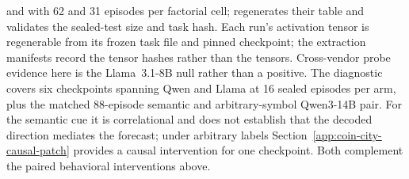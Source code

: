  and
 with 62 and 31 episodes per factorial
cell;  regenerates their table
and validates the sealed-test size and task hash. Each run's
activation tensor is regenerable from its frozen task file and pinned checkpoint;
the extraction manifests record the tensor hashes rather than the tensors.
Cross-vendor probe evidence here is the Llama~3.1-8B null rather than a
positive. The diagnostic covers six checkpoints spanning Qwen and Llama at 16 sealed episodes per arm, plus
the matched 88-episode semantic and arbitrary-symbol Qwen3-14B pair. For the semantic
cue it is correlational and does not establish that the decoded direction
mediates the forecast; under arbitrary labels
Section~\ref{app:coin-city-causal-patch} provides a causal intervention for one
checkpoint. Both complement the paired behavioral interventions above.
